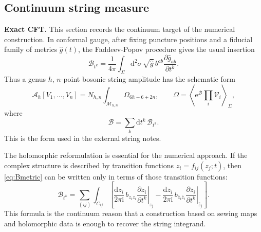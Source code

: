 \documentclass[11pt]{article}
\numberwithin{equation}{section}
\newcommand{\cB}{\mathcal B}
\newcommand{\cM}{\mathcal M}
\newcommand{\cV}{\mathcal V}
\newcommand{\dd}{\mathrm d}
\newcommand{\ee}{\mathrm e}
\newcommand{\ii}{\mathrm i}
\newcommand{\cA}{\mathcal A}
\begin{document}
\subsection{Continuum string measure}

\noindent\textbf{Exact CFT.}
This section records the continuum target of the numerical construction.  In
conformal gauge, after fixing puncture positions and a fiducial family of
metrics \(\hat g(t)\), the Faddeev-Popov procedure gives the usual insertion
\begin{equation}
        \cB_{t^k}
        =
        \frac{1}{4\pi}
        \int_{\Sigma}\dd^2\sigma\,\sqrt{\hat g}\,
        b^{ab}\frac{\partial \hat g_{ab}}{\partial t^k}.
        \label{eq:Bmetric}
\end{equation}
Thus a genus \(h\), \(n\)-point bosonic string amplitude has the schematic
form
\begin{equation}
        \cA_h[V_1,\ldots,V_n]
        =
        N_{h,n}\int_{\cM_{h,n}}\Omega_{6h-6+2n},
        \qquad
        \Omega=\left\langle \ee^{\cB}\prod_i\cV_i\right\rangle_{\Sigma},
        \label{eq:stringmeasure}
\end{equation}
where
\begin{equation}
        \cB=\sum_k \dd t^k\,\cB_{t^k}.
\end{equation}
This is the form used in the external string notes.

The holomorphic reformulation is essential for the numerical approach.  If the
complex structure is described by transition functions \(z_i=f_{ij}(z_j;t)\),
then \eqref{eq:Bmetric} can be written only in terms of those transition
functions:
\begin{equation}
        \cB_{t^k}
        =
        \sum_{(ij)}
        \int_{C_{ij}}
        \left[
        \frac{\dd z_i}{2\pi\ii}\,
        b_{z_i z_i}
        \left.\frac{\partial z_i}{\partial t^k}\right|_{z_j}
        -
        \frac{\dd\bar z_i}{2\pi\ii}\,
        b_{\bar z_i\bar z_i}
        \left.\frac{\partial \bar z_i}{\partial t^k}\right|_{\bar z_j}
        \right].
        \label{eq:Btransition}
\end{equation}
This formula is the continuum reason that a construction based on sewing maps
and holomorphic data is enough to recover the string integrand.
\end{document}
